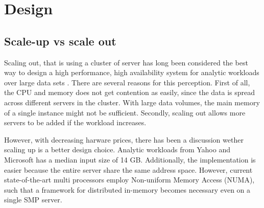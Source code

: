 \chapter{Design}

\section{Scale-up vs scale out}
Scaling out, that is using a cluster of server has long been considered the best way to design a high performance, high availability system for analytic workloads over large data sets \cite{Mukherjee2015-ul}. There are several reasons for this perception. First of all, the CPU and memory does not get contention as easily, since the data is spread across different servers in the cluster. With large data volumes, the main memory of a single instance might not be sufficient. Secondly, scaling out allows more servers to be added if the workload increases.

However, with decreasing harware prices, there has been a discussion wether scaling up is a better design choice. Analytic workloads from Yahoo and Microsoft has a median input size of 14 GB. Additionally, the implementation is easier because the entire server share the same address space. However, current state-of-the-art multi processors employ Non-uniform Memory Access (NUMA), such that a framework for distributed in-memory becomes necessary even on a single SMP server.
